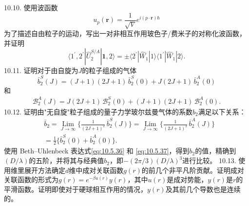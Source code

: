 10.10. 使用波函数
\begin{equation}\tag{10.7.37}\label{eq:10.7.37}
u _ { p } ( \boldsymbol { r } ) = \frac { 1 } { \sqrt { V } } e ^{i ( p \cdot \boldsymbol { r} ) \hbar }
\end{equation}
为了描述自由粒子的运动，写出一对非相互作用玻色子/费米子的对称化波函数，并证明
\begin{equation}\tag{10.7.38}\label{eq:10.7.38}
\langle 1 ^{\prime} , 2 ^{\prime} | \hat { U } _ { 2 } ^{S / A} | \mathbf { 1 } , 2 \rangle = \pm \langle 2 ^{\prime} | \hat { W } _ { 1 } | 1 \rangle \langle 1 ^{\prime} | \hat { W } _ { 1 } | 2 \rangle .
\end{equation}
10.11. 证明对于由自旋为\(J\)的粒子组成的气体
\begin{equation}\tag{10.7.39}\label{eq:10.7.39}
\bar { b } _ { 2 } ^{S} ( J ) = ( J + 1 ) ( 2 J + 1 ) \, \bar { b } _ { 2 } ^{S} ( 0 ) + J ( 2 J + 1 ) \, \bar { b } _ { 2 } ^{A} ( 0 )
\end{equation}
和
\begin{equation}\tag{10.7.40}\label{eq:10.7.40}
\begin{array}{r} { \mathcal { B } _ { 2 } ^{A} ( J ) = J ( 2 J + 1 ) \, \mathcal { B } _ { 2 } ^{S} ( 0 ) + ( J + 1 ) ( 2 J + 1 ) \, \mathcal { B } _ { 2 } ^{A} ( 0 ) . } \end{array}
\end{equation}
10.12. 证明由"无自旋"粒子组成的量子力学玻尔兹曼气体的系数\(b_{2}\)满足以下关系：
\begin{equation}\tag{10.7.41}\label{eq:10.7.41}
\begin{array}{rl} & { \bar { b } _ { 2 } = \operatorname* { L i m } _ { J \to \infty } \Big \{ \frac { 1 } { ( 2 J + 1 ) ^{2} } \, \bar { b } _ { 2 } ^{S} ( J ) \Big \} = \operatorname* { L i m } _ { J \to \infty } \Big \{ \frac { 1 } { ( 2 J + 1 ) ^{2} } \, \bar { b } _ { 2 } ^{A} ( J ) \Big \} } \\& { = \frac { 1 } { 2 } \{ \bar { b } _ { 2 } ^{S} ( 0 ) + \bar { b } _ { 2 } ^{A} ( 0 ) \} . } \end{array}
\end{equation}
使用 Beth--Uhlenbeck 表达式\autoref{eq:10.5.36} 和 \autoref{eq:10.5.37}，得到\(b_{2}\)的值，精确到\((D/\lambda)\)的五阶，并将其与经典值\(b_{2}\)，即\(-(2\pi/3)(D/\lambda)^{3}\)进行比较。
10.13. 使用维里展开方法确定\(d\)维中成对关联函数\(g(r)\)的前几个非平凡阶贡献。证明成对关联函数的形式为\(g(r) = e^{-\beta u(r)}y(r)\)，其中\(u(r)\)是成对势能，\(y(r)\)是\(r\)的平滑函数。证明即使对于硬球相互作用的情况，\(y(r)\)及其前几个导数也是连续的。
